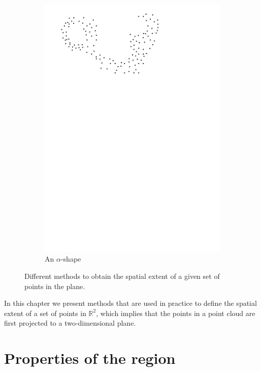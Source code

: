 \begin{figure}
\begin{subfigure}[b]{0.21\linewidth}
    \includegraphics[page=4,width=\textwidth]{figs/idea.pdf}
    \caption{An $\alpha$-shape}
    \label{fig:ideas:d}
  \end{subfigure}
\caption{Different methods to obtain the spatial extent of a given set of points in the plane.}
\label{fig:ideas}  
\end{figure}

%

In this chapter we present methods that are used in practice to define the spatial extent of a set of points in $\mathbb{R}^2$, which implies that the points in a point cloud are first projected to a two-dimensional plane.



%
\section{Properties of the region}
\label{sec:properties}

